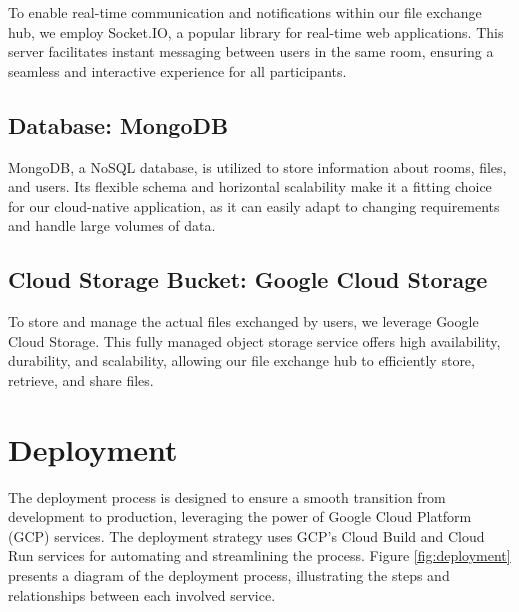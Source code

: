 \documentclass[a4paper,fleqn]{cas-dc}
\begin{document}
To enable real-time communication and notifications within our file exchange hub, we employ Socket.IO, a popular library for real-time web applications. This server facilitates instant messaging between users in the same room, ensuring a seamless and interactive experience for all participants.

\subsection{Database: MongoDB}

MongoDB, a NoSQL database, is utilized to store information about rooms, files, and users. Its flexible schema and horizontal scalability make it a fitting choice for our cloud-native application, as it can easily adapt to changing requirements and handle large volumes of data.

\subsection{Cloud Storage Bucket: Google Cloud Storage}

To store and manage the actual files exchanged by users, we leverage Google Cloud Storage. This fully managed object storage service offers high availability, durability, and scalability, allowing our file exchange hub to efficiently store, retrieve, and share files.

\section{Deployment}

The deployment process is designed to ensure a smooth transition from development to production, leveraging the power of Google Cloud Platform (GCP) services. The deployment strategy uses GCP's Cloud Build and Cloud Run services for automating and streamlining the process. Figure \ref{fig:deployment} presents a diagram of the deployment process, illustrating the steps and relationships between each involved service.

\end{document}
